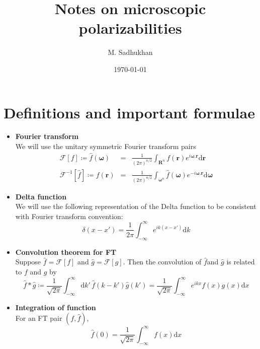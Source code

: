 \documentclass{article}
\newcommand{\diff}{\mathrm{d}}
\newcommand{\rr}{\mathbf{r}}
\begin{document}
\title{Notes on microscopic polarizabilities}
\author{M. Sadhukhan}
\date{\today}

\maketitle
\tableofcontents
\section{Definitions and important formulae}
\begin{itemize}
 \item{\bf Fourier transform}\\

    We will use the unitary symmetric Fourier transform pairs
     \begin{eqnarray*}
      \mathcal{F}[f] \coloneqq \hat{f}(\boldsymbol{\omega})&=& \frac{1}{(2\pi)^{n/2}}\int_{\mathbf{R}^{n}}f(\rr)e^{i\boldsymbol{\omega}.\rr}\diff \rr \\
     \mathcal{F}^{-1}[\hat f] \coloneqq  f(\rr)&=& \frac{1}{(2\pi)^{n/2}}\int_{\boldsymbol{\omega}^{n}}\hat{f}(\boldsymbol{\omega})e^{-i\boldsymbol{\omega}.\rr}\diff \boldsymbol{\omega}
     \end{eqnarray*} 
 \item{\bf Delta function}\\

   We will use the following representation of the Delta function to be consistent with Fourier transform convention:\\
\begin{equation*}
 \delta(x-x')= \frac{1}{2\pi} \int_{-\infty}^{\infty}  e^{ik(x-x')}\diff k
\end{equation*}

\item{\bf Convolution theorem for FT}\\

 Suppose $\hat{f} = \mathcal{F}[f]$ and $\hat{g} = \mathcal{F}[g]$. Then the convolution of $\hat{f}$and  $\hat{g}$ is related to $f$ and $g$ by 
\begin{equation*}
\hat{f}*\hat{g} \coloneqq \frac{1}{\sqrt{2\pi}} \int_{-\infty}^{\infty} \diff k' \, \hat{f}(k-k')\hat{g}(k')= \frac{1}{\sqrt{2\pi}}  \int_{-\infty}^{\infty} e^{ik x} f(x) g(x) \diff x
\end{equation*}
\item{\bf Integration of function}\\
 For an FT pair $(f,\hat{f})$,
\begin{equation*}
\hat{f}(0) = \frac{1}{\sqrt{2\pi}} \int_{-\infty}^{\infty} f(x) \diff x
\end{equation*}


\end{itemize}
\end{document}
